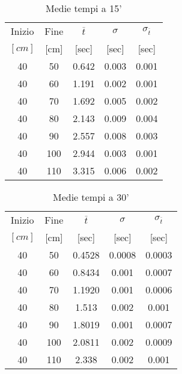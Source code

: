 \documentclass[a4paper,11pt,oneside]{article}
\begin{document}
\begin{table}[h!]
    \centering
    \begin{tabular}{cc|ccc}
        \toprule
        Inizio&Fine&$\overline{t}$&$\sigma$&$\sigma_{\overline{t}}$\\
        $[\si{cm}]$&[cm]&[sec]&[sec]&[sec]\\
        \midrule
        40 & 50  & 0.642 & 0.003  & 0.001 \\
        40 & 60  & 1.191 & 0.002 & 0.001 \\
        40 & 70  & 1.692 & 0.005 & 0.002 \\
        40 & 80  & 2.143 & 0.009 & 0.004 \\
        40 & 90  & 2.557 & 0.008 & 0.003 \\
        40 & 100 & 2.944 & 0.003 & 0.001 \\
        40 & 110 & 3.315 & 0.006 & 0.002\\
        \bottomrule
    \end{tabular}
        \caption{Medie tempi a 15'}
        \label{tab:15_primi}
    \end{table}
    
\begin{table}[h!]
    \centering
    \begin{tabular}{cc|ccc}
        \toprule
        Inizio&Fine&$\overline{t}$&$\sigma$&$\sigma_{\overline{t}}$\\
        $[\si{cm}]$&[cm]&[sec]&[sec]&[sec]\\\midrule
        40 & 50  & 0.4528 & 0.0008 & 0.0003 \\
        40 & 60  & 0.8434 & 0.001  & 0.0007 \\
        40 & 70  & 1.1920 & 0.001  & 0.0006 \\
        40 & 80  & 1.513 & 0.002  & 0.001  \\
        40 & 90  & 1.8019 & 0.001  & 0.0007 \\
        40 & 100 & 2.0811 & 0.002  & 0.0009 \\
        40 & 110 & 2.338  & 0.002  & 0.001 \\
        \bottomrule
        \end{tabular}
    \caption{Medie tempi a 30'}
    \label{tab:30_primi}
    \end{table}
\end{document}
